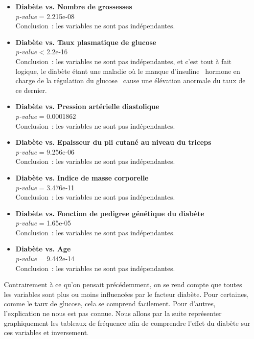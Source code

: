 \documentclass[a4paper,10pt]{report}
\begin{document}
\begin{itemize}
	\item \textbf{Diabète vs. Nombre de grossesses}
	\\ \textit{p-value} = 2.215e-08
	\\ Conclusion~: les variables ne sont pas indépendantes.
	
	\item \textbf{Diabète vs. Taux plasmatique de glucose}
	\\ \textit{p-value} < 2.2e-16
	\\ Conclusion~: les variables ne sont pas indépendantes, et c'est tout à fait logique, le diabète étant une maladie où le manque d'insuline \textthreequartersemdash\ hormone en charge de la régulation du glucose \textthreequartersemdash\ cause une élévation anormale du taux de ce dernier.
	
	\item \textbf{Diabète vs. Pression artérielle diastolique}
	\\ \textit{p-value} = 0.0001862
	\\ Conclusion~: les variables ne sont pas indépendantes.
	
	\item \textbf{Diabète vs. Epaisseur du pli cutané au niveau du triceps}
	\\ \textit{p-value} = 9.256e-06
	\\ Conclusion~: les variables ne sont pas indépendantes.
	
	\item \textbf{Diabète vs. Indice de masse corporelle}
	\\ \textit{p-value} = 3.476e-11
	\\ Conclusion~: les variables ne sont pas indépendantes.
	
	\item \textbf{Diabète vs. Fonction de pedigree génétique du diabète}
	\\ \textit{p-value} = 1.65e-05
	\\ Conclusion~: les variables ne sont pas indépendantes.
	
	\item \textbf{Diabète vs. Age}
	\\ \textit{p-value} = 9.442e-14
	\\ Conclusion~: les variables ne sont pas indépendantes.
\end{itemize}


Contrairement à ce qu'on pensait précédemment, on se rend compte que toutes les variables sont plus ou moins influencées par le facteur diabète. Pour certaines, comme le taux de glucose, cela se comprend facilement. Pour d'autres, l'explication ne nous est pas connue. Nous allons par la suite représenter graphiquement les tableaux de fréquence afin de comprendre l'effet du diabète sur ces variables et inversement.
\end{document}
